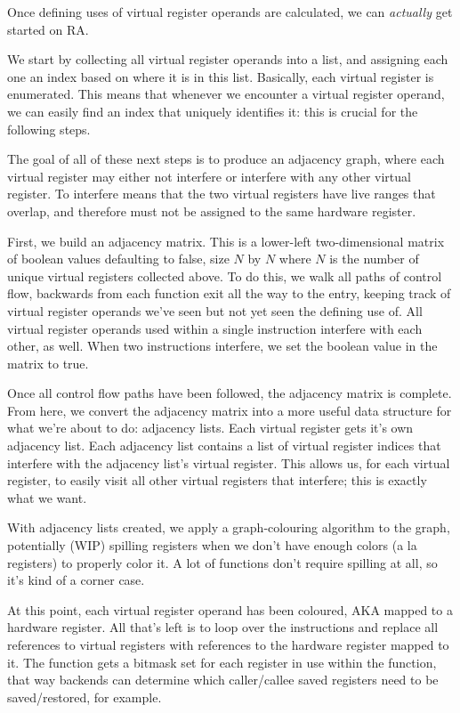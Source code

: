 \documentclass[12pt]{article}
\begin{document}
Once defining uses of virtual register operands are calculated, we can \emph{actually} get started on RA.

We start by collecting all virtual register operands into a list, and assigning each one an index based on where it is in this list. Basically, each virtual register is enumerated. This means that whenever we encounter a virtual register operand, we can easily find an index that uniquely identifies it: this is crucial for the following steps.

The goal of all of these next steps is to produce an adjacency graph, where each virtual register may either not interfere or interfere with any other virtual register. To interfere means that the two virtual registers have live ranges that overlap, and therefore must not be assigned to the same hardware register.

First, we build an adjacency matrix. This is a lower-left two-dimensional matrix of boolean values defaulting to false, size $N$ by $N$ where $N$ is the number of unique virtual registers collected above. To do this, we walk all paths of control flow, backwards from each function exit all the way to the entry, keeping track of virtual register operands we've seen but not yet seen the defining use of. All virtual register operands used within a single instruction interfere with each other, as well. When two instructions interfere, we set the boolean value in the matrix to true.

Once all control flow paths have been followed, the adjacency matrix is complete. From here, we convert the adjacency matrix into a more useful data structure for what we're about to do: adjacency lists. Each virtual register gets it's own adjacency list. Each adjacency list contains a list of virtual register indices that interfere with the adjacency list's virtual register. This allows us, for each virtual register, to easily visit all other virtual registers that interfere; this is exactly what we want.

With adjacency lists created, we apply a graph-colouring algorithm to the graph, potentially (WIP) spilling registers when we don't have enough colors (a la registers) to properly color it. A lot of functions don't require spilling at all, so it's kind of a corner case.

At this point, each virtual register operand has been coloured, AKA mapped to a hardware register. All that's left is to loop over the instructions and replace all references to virtual registers with references to the hardware register mapped to it. The function gets a bitmask set for each register in use within the function, that way backends can determine which caller/callee saved registers need to be saved/restored, for example.
\end{document}

